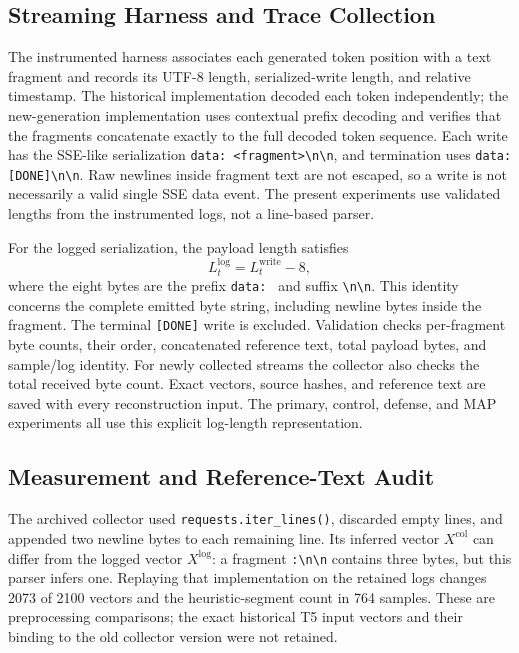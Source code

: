 \documentclass[electronics,article,submit,pdftex,moreauthors]{Definitions/mdpi}
\begin{document}
\subsection{Streaming Harness and Trace Collection}
The instrumented harness associates each generated token position with a text fragment and records its UTF-8 length, serialized-write length, and relative timestamp. The historical implementation decoded each token independently; the new-generation implementation uses contextual prefix decoding and verifies that the fragments concatenate exactly to the full decoded token sequence. Each write has the SSE-like serialization \texttt{data: \textless fragment\textgreater\textbackslash n\textbackslash n}, and termination uses \texttt{data: [DONE]\textbackslash n\textbackslash n}. Raw newlines inside fragment text are not escaped, so a write is not necessarily a valid single SSE data event. The present experiments use validated lengths from the instrumented logs, not a line-based parser.

For the logged serialization, the payload length satisfies
\begin{equation}
L^{\mathrm{log}}_t = L^{\mathrm{write}}_t - 8,
\end{equation}
where the eight bytes are the prefix \texttt{data: } and suffix \texttt{\textbackslash n\textbackslash n}. This identity concerns the complete emitted byte string, including newline bytes inside the fragment. The terminal \texttt{[DONE]} write is excluded. Validation checks per-fragment byte counts, their order, concatenated reference text, total payload bytes, and sample/log identity. For newly collected streams the collector also checks the total received byte count. Exact vectors, source hashes, and reference text are saved with every reconstruction input. The primary, control, defense, and MAP experiments all use this explicit log-length representation.

\subsection{Measurement and Reference-Text Audit}\label{sec:measurement-audit}
The archived collector used \texttt{requests.iter\_lines()}, discarded empty lines, and appended two newline bytes to each remaining line. Its inferred vector $X^{\mathrm{col}}$ can differ from the logged vector $X^{\mathrm{log}}$: a fragment \texttt{:\textbackslash n\textbackslash n} contains three bytes, but this parser infers one. Replaying that implementation on the retained logs changes 2073 of 2100 vectors and the heuristic-segment count in 764 samples. These are preprocessing comparisons; the exact historical T5 input vectors and their binding to the old collector version were not retained.
\end{document}
